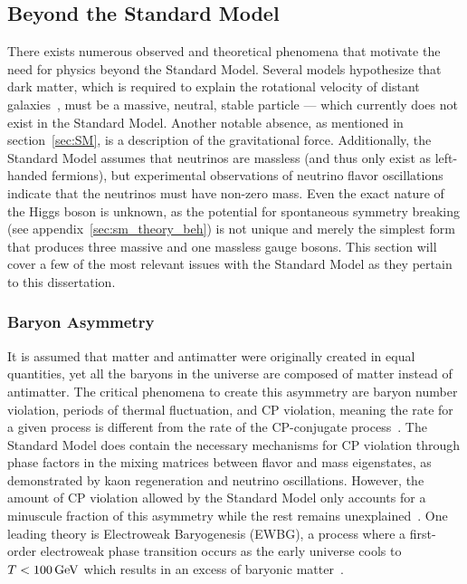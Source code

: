 \subsection{Beyond the Standard Model} \label{sec:theory_motivation}
There exists numerous observed and theoretical phenomena that motivate the need for physics beyond the Standard Model. Several models hypothesize that dark matter, which is required to explain the rotational velocity of distant galaxies~\cite{zwicky_dm}, must be a massive, neutral, stable particle --- which currently does not exist in the Standard Model. Another notable absence, as mentioned in section~\ref{sec:SM}, is a description of the gravitational force. Additionally, the Standard Model assumes that neutrinos are massless (and thus only exist as left-handed fermions), but experimental observations of neutrino flavor oscillations indicate that the neutrinos must have non-zero mass. Even the exact nature of the Higgs boson is unknown, as the potential for spontaneous symmetry breaking (see appendix~\ref{sec:sm_theory_beh}) is not unique and merely the simplest form that produces three massive and one massless gauge bosons. This section will cover a few of the most relevant issues with the Standard Model as they pertain to this dissertation.

\subsubsection{Baryon Asymmetry} \label{sec:baryon_asymmetry}
It is assumed that matter and antimatter were originally created in equal quantities, yet all the baryons in the universe are composed of matter instead of antimatter. The critical phenomena to create this asymmetry are baryon number violation, periods of thermal fluctuation, and CP violation, meaning the rate for a given process is different from the rate of the CP-conjugate process~\cite{Sakharov:1967dj}. The Standard Model does contain the necessary mechanisms for CP violation through phase factors in the mixing matrices between flavor and mass eigenstates, as demonstrated by kaon regeneration and neutrino oscillations. However, the amount of CP violation allowed by the Standard Model only accounts for a minuscule fraction of this asymmetry while the rest remains unexplained~\cite{Peskin2002}. One leading theory is Electroweak Baryogenesis (EWBG), a process where a first-order electroweak phase transition occurs as the early universe cools to $T<100\,\text{Ge\hspace{-.08em}V}$ which results in an excess of baryonic matter~\cite{ewbg1,ewbg2}.

